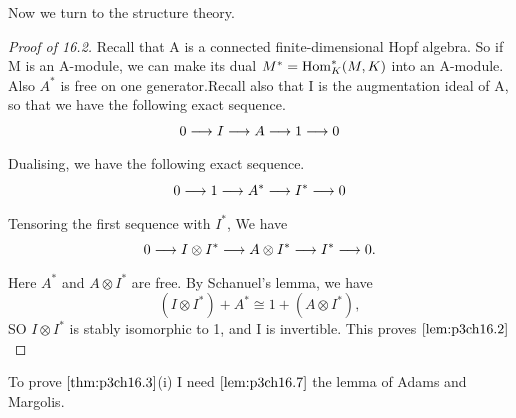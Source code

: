\documentclass[../main]{subfiles}
\begin{document}
Now we turn to the structure theory.

\begin{proof}[Proof of 16.2] Recall that A is a connected finite-dimensional
Hopf algebra. So if M is an A-module, we can make its dual $M^{\ast}=\mathrm{Hom}_{K}^{\ast}(M, K)$ into an A-module. Also $A^{\ast}$ is free on one generator.Recall also that I is the augmentation ideal of A, so that we have the
following exact sequence. \begin{equation*} 
    0 \lar{} I \lar{} A \lar{} 1 \lar{} 0
\end{equation*}
Dualising, we have the following exact sequence. 
\begin{equation*}
    0 \lar{} 1 \lar{} A^{\ast} \lar{} I^{\ast} \lar{} 0
\end{equation*}
Tensoring the first sequence with $I^{\ast}$, We have \begin{equation*}
    0 \lar{} I\otimes I^{\ast} \lar{} A\otimes I^{\ast} \lar{} I^{\ast} \lar{} 0.
\end{equation*}
Here $A^\ast$ and $A\otimes I^\ast$ are free. By Schanuel's lemma, we have \begin{equation*}
    \left(I\otimes I^{\ast}\right)+ A^{\ast}\cong 1+(A\otimes I^{\ast}), 
\end{equation*}
SO $I\otimes I^{\ast}$ is stably isomorphic to 1, and I is invertible. This proves $\ref{lem:p3ch16.2}$
\end{proof}
To prove $\ref{thm:p3ch16.3}$(i) I need $\ref{lem:p3ch16.7}$ the lemma of Adams and Margolis.
\end{document}
